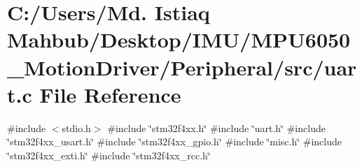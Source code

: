 \section{C\+:/\+Users/\+Md. Istiaq Mahbub/\+Desktop/\+I\+M\+U/\+M\+P\+U6050\+\_\+\+Motion\+Driver/\+Peripheral/src/uart.c File Reference}
\label{uart_8c}
{\ttfamily \#include $<$stdio.\+h$>$}\newline
{\ttfamily \#include \char`\"{}stm32f4xx.\+h\char`\"{}}\newline
{\ttfamily \#include \char`\"{}uart.\+h\char`\"{}}\newline
{\ttfamily \#include \char`\"{}stm32f4xx\+\_\+usart.\+h\char`\"{}}\newline
{\ttfamily \#include \char`\"{}stm32f4xx\+\_\+gpio.\+h\char`\"{}}\newline
{\ttfamily \#include \char`\"{}misc.\+h\char`\"{}}\newline
{\ttfamily \#include \char`\"{}stm32f4xx\+\_\+exti.\+h\char`\"{}}\newline
{\ttfamily \#include \char`\"{}stm32f4xx\+\_\+rcc.\+h\char`\"{}}\newline
